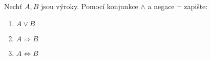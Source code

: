 Nechť $A, B$ jsou výroky.
Pomocí konjunkce $\wedge$ a negace $\neg$ zapište:
\begin{enumerate}

	\item  $A \vee B$
	
	\item  $A \Rightarrow B$

	\item  $A \Leftrightarrow B$

\end{enumerate}

